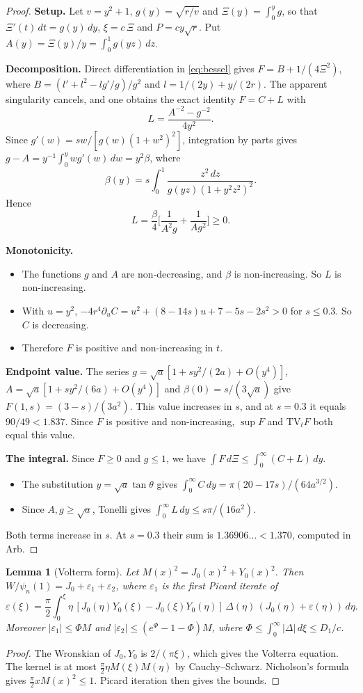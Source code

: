 \documentclass[11pt]{amsart}
\newtheorem{lemma}[proposition]{Lemma}
\theoremstyle{remark}
\numberwithin{equation}{section}
\begin{document}
\begin{proof}
\textbf{Setup.} Let $v=y^2+1$, $g(y)=\sqrt{r/v}$ and $\Xi(y)=\int_0^yg$, so that $\Xi'(t)\,dt=g(y)\,dy$, $\xi=c\,\Xi$ and $P=cy\sqrt r$. Put $A(y)=\Xi(y)/y=\int_0^1g(yz)\,dz$.

\textbf{Decomposition.} Direct differentiation in \eqref{eq:bessel} gives $F=B+1/(4\Xi^2)$, where $B=(l'+l^2-lg'/g)/g^2$ and $l=1/(2y)+y/(2r)$. The apparent singularity cancels, and one obtains the exact identity $F=C+L$ with
\[
L=\frac{A^{-2}-g^{-2}}{4y^2}.
\]
Since $g'(w)=sw/[g(w)(1+w^2)^2]$, integration by parts gives $g-A=y^{-1}\int_0^ywg'(w)\,dw=y^2\beta$, where
\[
\beta(y)=s\int_0^1\frac{z^2\,dz}{g(yz)(1+y^2z^2)^2}.
\]
Hence
\[
L=\frac\beta4\Big[\frac1{A^2g}+\frac1{Ag^2}\Big]\ge0.
\]

\textbf{Monotonicity.}
\begin{itemize}
\item The functions $g$ and $A$ are non-decreasing, and $\beta$ is non-increasing. So $L$ is non-increasing.
\item With $u=y^2$, $-4r^4\partial_uC=u^2+(8-14s)u+7-5s-2s^2>0$ for $s\le0.3$. So $C$ is decreasing.
\item Therefore $F$ is positive and non-increasing in $t$.
\end{itemize}

\textbf{Endpoint value.} The series $g=\sqrt a[1+sy^2/(2a)+O(y^4)]$, $A=\sqrt a[1+sy^2/(6a)+O(y^4)]$ and $\beta(0)=s/(3\sqrt a)$ give $F(1,s)=(3-s)/(3a^2)$. This value increases in $s$, and at $s=0.3$ it equals $90/49<1.837$. Since $F$ is positive and non-increasing, $\sup F$ and $\mathrm{TV}_tF$ both equal this value.

\textbf{The integral.} Since $F\ge0$ and $g\le1$, we have $\int F\,d\Xi\le\int_0^\infty(C+L)\,dy$.
\begin{itemize}
\item The substitution $y=\sqrt a\tan\theta$ gives $\int_0^\infty C\,dy=\pi(20-17s)/(64a^{3/2})$.
\item Since $A,g\ge\sqrt a$, Tonelli gives $\int_0^\infty L\,dy\le s\pi/(16a^2)$.
\end{itemize}
Both terms increase in $s$. At $s=0.3$ their sum is $1.36906\ldots<1.370$, computed in Arb.
\end{proof}

\begin{lemma}[Volterra form]\label{lem:volterra}
Let $M(x)^2=J_0(x)^2+Y_0(x)^2$. Then $W/\psi_n(1)=J_0+\varepsilon_1+\varepsilon_2$, where $\varepsilon_1$ is the first Picard iterate of
\[
\varepsilon(\xi)=\frac\pi2\int_0^\xi\eta\,[J_0(\eta)Y_0(\xi)-J_0(\xi)Y_0(\eta)]\,\Delta(\eta)\,(J_0(\eta)+\varepsilon(\eta))\,d\eta.
\]
Moreover $|\varepsilon_1|\le\Phi M$ and $|\varepsilon_2|\le(e^\Phi-1-\Phi)M$, where $\Phi\le\int_0^\infty|\Delta|\,d\xi\le D_1/c$.
\end{lemma}
\begin{proof}
The Wronskian of $J_0,Y_0$ is $2/(\pi\xi)$, which gives the Volterra equation. The kernel is at most $\frac\pi2\eta M(\xi)M(\eta)$ by Cauchy--Schwarz. Nicholson's formula \cite[10.9.30]{DLMF} gives $\frac\pi2xM(x)^2\le1$. Picard iteration then gives the bounds.
\end{proof}
\end{document}
